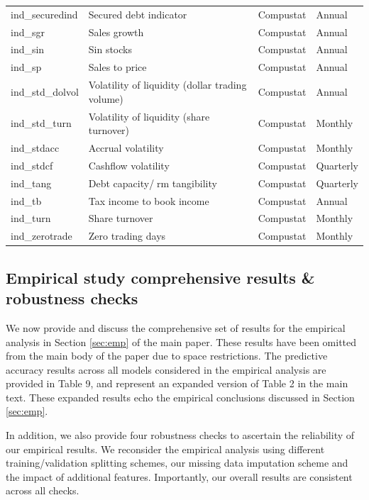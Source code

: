 \documentclass{article}
\begin{document}
\begin{center}
\begin{longtable}{llll}
			ind\_securedind & Secured debt indicator & Compustat & Annual \\
			ind\_sgr\footnotemark[\value{footnote}] & Sales growth & Compustat & Annual \\
			ind\_sin & Sin stocks & Compustat & Annual \\
			ind\_sp & Sales to price & Compustat & Annual \\
			ind\_std\_dolvol & Volatility of liquidity (dollar trading volume) & Compustat & Annual \\
			ind\_std\_turn & Volatility of liquidity (share turnover) & Compustat & Monthly \\
			ind\_stdacc\footnotemark[\value{footnote}] & Accrual volatility & Compustat & Monthly \\
			ind\_stdcf\footnotemark[\value{footnote}] & Cashflow volatility & Compustat & Quarterly \\
			ind\_tang & Debt capacity/rm tangibility & Compustat & Quarterly \\
			ind\_tb\footnotemark[\value{footnote}] & Tax income to book income & Compustat & Annual \\
			ind\_turn & Share turnover & Compustat & Monthly \\
			ind\_zerotrade & Zero trading days & Compustat & Monthly \\ \hline	
		\end{longtable}
	\end{center}
\newpage

\FloatBarrier
\subsection{Empirical study comprehensive results \& robustness checks}
\label{empirical_study_results}
We now provide and discuss the comprehensive set of results for the empirical analysis in Section \ref{sec:emp} of the main paper. These results have been omitted from the main body of the paper due to space restrictions. The predictive accuracy results across all models considered in the empirical analysis are provided in Table 9, and represent an expanded version of Table 2 in the main text. These expanded results echo the empirical conclusions discussed in Section \ref{sec:emp}. 

In addition, we also provide four robustness checks to ascertain the reliability of our empirical results. We reconsider the empirical analysis using different training/validation splitting schemes, our missing data imputation scheme and the impact of additional features. Importantly, our overall results are consistent across all checks.
\end{document}
